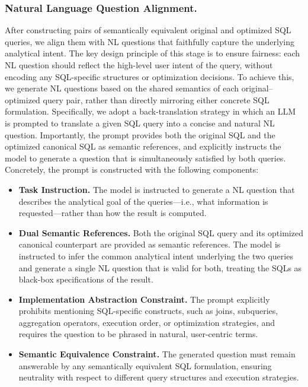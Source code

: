 \subsubsection{Natural Language Question Alignment.}
After constructing pairs of semantically equivalent original and optimized SQL queries, we align them with NL questions that faithfully capture the underlying analytical intent.
The key design principle of this stage is to ensure fairness: each NL question should reflect the high-level user intent of the query, without encoding any SQL-specific structures or optimization decisions.
To achieve this, we generate NL questions based on the shared semantics of each original–optimized query pair, rather than directly mirroring either concrete SQL formulation.
Specifically, we adopt a back-translation strategy in which an LLM is prompted to translate a given SQL query into a concise and natural NL question.
Importantly, the prompt provides both the original SQL and the optimized canonical SQL as semantic references, and explicitly instructs the model to generate a question that is simultaneously satisfied by both queries.
Concretely, the prompt is constructed with the following components:
\begin{itemize}[leftmargin=10pt]
	\item \textbf{Task Instruction.} 
	The model is instructed to generate a NL question that describes the analytical goal of the queries—i.e., what information is requested—rather than how the result is computed.
	
	\item \textbf{Dual Semantic References.} 
	Both the original SQL query and its optimized canonical counterpart are provided as semantic references.
	The model is instructed to infer the common analytical intent underlying the two queries and generate a single NL question that is valid for both, treating the SQLs as black-box specifications of the result.
	
	\item \textbf{Implementation Abstraction Constraint.} 
	The prompt explicitly prohibits mentioning SQL-specific constructs, such as joins, subqueries, aggregation operators, execution order, or optimization strategies, and requires the question to be phrased in natural, user-centric terms.
	
	\item \textbf{Semantic Equivalence Constraint.} 
	The generated question must remain answerable by any semantically equivalent SQL formulation, ensuring neutrality with respect to different query structures and execution strategies.
\end{itemize}
